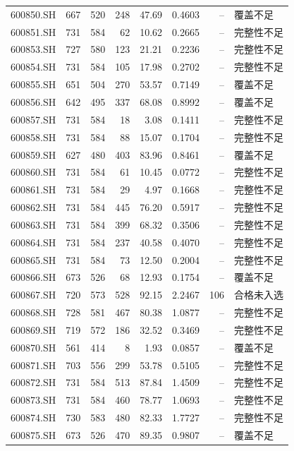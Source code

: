 \documentclass[10pt,a4paper]{article}
\begin{document}
\begin{longtable}{lrrr r r r l}
600850.SH & 667 & 520 & 248 & 47.69 & 0.4603 & -- & 覆盖不足\\
600851.SH & 731 & 584 & 62 & 10.62 & 0.2665 & -- & 完整性不足\\
600853.SH & 727 & 580 & 123 & 21.21 & 0.2236 & -- & 完整性不足\\
600854.SH & 731 & 584 & 105 & 17.98 & 0.2702 & -- & 完整性不足\\
600855.SH & 651 & 504 & 270 & 53.57 & 0.7149 & -- & 覆盖不足\\
600856.SH & 642 & 495 & 337 & 68.08 & 0.8992 & -- & 覆盖不足\\
600857.SH & 731 & 584 & 18 & 3.08 & 0.1411 & -- & 完整性不足\\
600858.SH & 731 & 584 & 88 & 15.07 & 0.1704 & -- & 完整性不足\\
600859.SH & 627 & 480 & 403 & 83.96 & 0.8461 & -- & 覆盖不足\\
600860.SH & 731 & 584 & 61 & 10.45 & 0.0772 & -- & 完整性不足\\
600861.SH & 731 & 584 & 29 & 4.97 & 0.1668 & -- & 完整性不足\\
600862.SH & 731 & 584 & 445 & 76.20 & 0.5917 & -- & 完整性不足\\
600863.SH & 731 & 584 & 399 & 68.32 & 0.3506 & -- & 完整性不足\\
600864.SH & 731 & 584 & 237 & 40.58 & 0.4070 & -- & 完整性不足\\
600865.SH & 731 & 584 & 73 & 12.50 & 0.2004 & -- & 完整性不足\\
600866.SH & 673 & 526 & 68 & 12.93 & 0.1754 & -- & 覆盖不足\\
600867.SH & 720 & 573 & 528 & 92.15 & 2.2467 & 106 & 合格未入选\\
600868.SH & 728 & 581 & 467 & 80.38 & 1.0877 & -- & 完整性不足\\
600869.SH & 719 & 572 & 186 & 32.52 & 0.3469 & -- & 完整性不足\\
600870.SH & 561 & 414 & 8 & 1.93 & 0.0857 & -- & 覆盖不足\\
600871.SH & 703 & 556 & 299 & 53.78 & 0.5105 & -- & 完整性不足\\
600872.SH & 731 & 584 & 513 & 87.84 & 1.4509 & -- & 完整性不足\\
600873.SH & 731 & 584 & 460 & 78.77 & 1.0693 & -- & 完整性不足\\
600874.SH & 730 & 583 & 480 & 82.33 & 1.7727 & -- & 完整性不足\\
600875.SH & 673 & 526 & 470 & 89.35 & 0.9807 & -- & 覆盖不足\\

\end{longtable}
\end{document}
